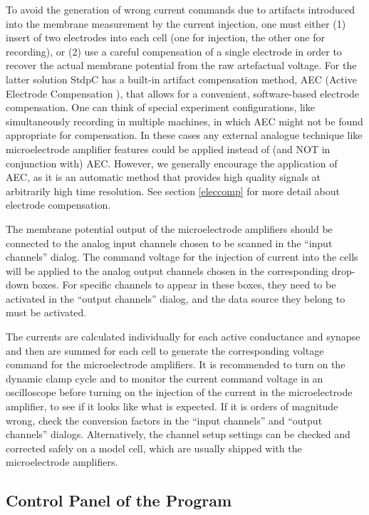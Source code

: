 \documentclass{article}
\begin{document}
To avoid the generation of wrong current commands due to artifacts
introduced into the membrane measurement by the current injection,
one must either (1) insert of two electrodes into each cell (one for
injection, the other one for recording), or
(2) use a careful compensation of a single electrode in order to recover the
actual membrane potential from the raw artefactual voltage. For the
latter solution StdpC has a built-in artifact compensation method, AEC
(Active Electrode Compensation \cite{Brette2008}), that allows for a
convenient, software-based electrode compensation. One can think of
special experiment configurations, like simultaneously recording in multiple
machines, in which AEC might not be found appropriate for compensation. In
these cases any external analogue technique like microelectrode amplifier 
features could
be applied instead of (and NOT in conjunction with) AEC. However, we
generally encourage the application of AEC, as it is an automatic method
that provides high quality signals at arbitrarily high time resolution.
See section \ref{eleccomp} for more detail about electrode compensation.

The membrane potential output of the microelectrode amplifiers should
be connected to the analog input channels chosen to be scanned in the
``input channels'' dialog. The command voltage for the injection of
current into the cells will be applied to the analog output channels chosen in
the corresponding drop-down boxes. For specific channels to appear in
these boxes, they need to be activated in the ``output channels''
dialog, and the data source they belong to must be activated.

The currents are calculated individually for each active conductance and
synapse and then are summed for each cell to generate the
corresponding voltage command for the microelectrode amplifiers. It is
recommended to turn on the dynamic clamp cycle and to monitor the
current command voltage in an oscilloscope before turning on the
injection of the current in the microelectrode amplifier, to see if it
looks like what is expected. If it is orders of magnitude wrong, check
the conversion factors in the ``input channels'' and ``output
channels'' dialogs. Alternatively, the channel setup settings can be checked and
corrected safely on a model cell, which are usually shipped with the
microelectrode amplifiers.

 
\subsection{Control Panel of the Program}
\end{document}
